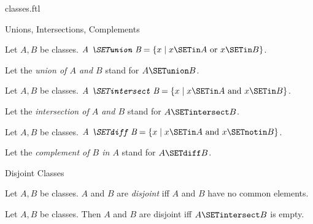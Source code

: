 \documentclass{naproche-library}
\begin{document}
\begin{smodule}[title=Classes]{classes.ftl}
\begin{sfragment}{Unions, Intersections, Complements}
  \begin{definition}[forthel,id=FOUNDATIONS_01_2159753924968448]
    Let $A, B$ be classes.
    $\emph{A \SETunion B} = \{ x \mid x \SETin A\text{ or }x \SETin B \}$.

    Let the \emph{union of $A$ and $B$} stand for $A \SETunion B$.
  \end{definition}

  \begin{definition}[forthel,id=FOUNDATIONS_01_5744033011859456]
    Let $A, B$ be classes.
    $\emph{A \SETintersect B} = \{ x \mid x \SETin A\text{ and }x \SETin B \}$.

    Let the \emph{intersection of $A$ and $B$} stand for $A \SETintersect B$.
  \end{definition}

  \begin{definition}[forthel,id=FOUNDATIONS_01_7620345041256448]
    Let $A, B$ be classes.
    $\emph{A \SETdiff B} = \{ x \mid x \SETin A\text{ and }x \SETnotin B \}$.

    Let the \emph{complement of $B$ in $A$} stand for $A \SETdiff B$.
  \end{definition}
\end{sfragment}

\begin{sfragment}{Disjoint Classes}
  \begin{definition}[forthel,id=FOUNDATIONS_01_4981913324355584]
    Let $A, B$ be classes.
    $A$ and $B$ are \emph{disjoint} iff $A$ and $B$ have no common elements.
  \end{definition}

  \begin{proposition}[forthel,id=FOUNDATIONS_01_1211191546347520]
    Let $A, B$ be classes.
    Then $A$ and $B$ are disjoint iff $A \SETintersect B$ is empty.
  \end{proposition}
\end{sfragment}
\end{smodule}
\end{document}
